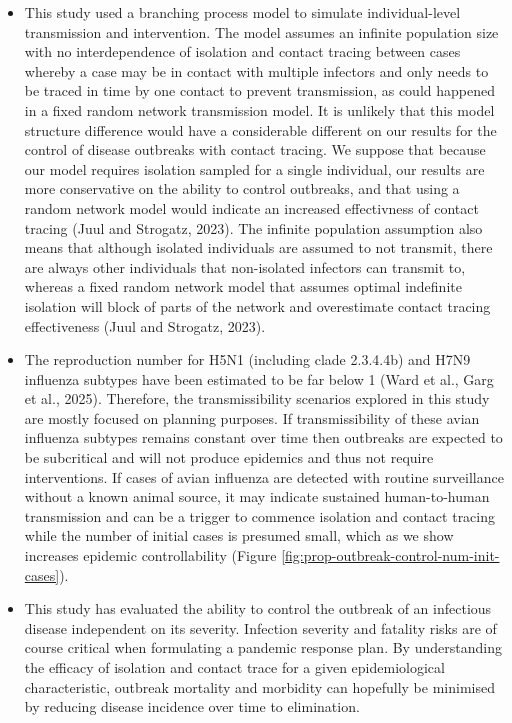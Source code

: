 \documentclass{article}
\begin{document}
\begin{itemize}
\item This study used a branching process model to simulate individual-level transmission and intervention. The model assumes an infinite population size with no interdependence of isolation and contact tracing between cases whereby a case may be in contact with multiple infectors and only needs to be traced in time by one contact to prevent transmission, as could happened in a fixed random network transmission model. It is unlikely that this model structure difference would have a considerable different on our results for the control of disease outbreaks with contact tracing. We suppose that because our model requires isolation sampled for a single individual, our results are more conservative on the ability to control outbreaks, and that using a random network model would indicate an increased effectivness of contact tracing (Juul and Strogatz, 2023). The infinite population assumption also means that although isolated individuals are assumed to not transmit, there are always other individuals that non-isolated infectors can transmit to, whereas a fixed random network model that assumes optimal indefinite isolation will block of parts of the network and overestimate contact tracing effectiveness (Juul and Strogatz, 2023).
\item The reproduction number for H5N1 (including clade 2.3.4.4b) and H7N9 influenza subtypes have been estimated to be far below 1 (Ward et al., Garg et al., 2025). Therefore, the transmissibility scenarios explored in this study are mostly focused on planning purposes. If transmissibility of these avian influenza subtypes remains constant over time then outbreaks are expected to be subcritical and will not produce epidemics and thus not require interventions. If cases of avian influenza are detected with routine surveillance without a known animal source, it may indicate sustained human-to-human transmission and can be a trigger to commence isolation and contact tracing while the number of initial cases is presumed small, which as we show increases epidemic controllability (Figure \ref{fig:prop-outbreak-control-num-init-cases}).
\item This study has evaluated the ability to control the outbreak of an infectious disease independent on its severity. Infection severity and fatality risks are of course critical when formulating a pandemic response plan. By understanding the efficacy of isolation and contact trace for a given epidemiological characteristic, outbreak mortality and morbidity can hopefully be minimised by reducing disease incidence over time to elimination.

\end{itemize}
\end{document}
